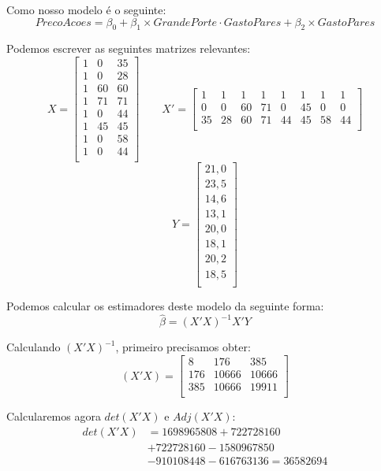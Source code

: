 \documentclass[]{ufpe-exercises}
\begin{document}
\begin{questions}
\begin{parts}
\begin{solution}
			\vspace{0.2cm}

			Como nosso modelo é o seguinte:
			\[ PrecoAcoes = \beta_{0} + \beta_{1} \times GrandePorte \cdot GastoPares + \beta_{2} \times GastoPares\]

			Podemos escrever as seguintes matrizes relevantes:
			\[ X =
				\begin{bmatrix}
					1 & 0  & 35 \\
					1 & 0  & 28 \\
					1 & 60 & 60 \\
					1 & 71 & 71 \\
					1 & 0  & 44 \\
					1 & 45 & 45 \\
					1 & 0  & 58 \\
					1 & 0  & 44 \\
				\end{bmatrix} \qquad
				X' =
				\begin{bmatrix}
					1  & 1  & 1  & 1  & 1  & 1  & 1  & 1  \\
					0  & 0  & 60 & 71 & 0  & 45 & 0  & 0  \\
					35 & 28 & 60 & 71 & 44 & 45 & 58 & 44 \\
				\end{bmatrix}
			\]
			\[
				Y =
				\begin{bmatrix}
					21,0 \\
					23,5 \\
					14,6 \\
					13,1 \\
					20,0 \\
					18,1 \\
					20,2 \\
					18,5 \\
				\end{bmatrix}
			\]

			Podemos calcular os estimadores deste modelo da seguinte forma:
			\[\hat{\beta} = (X'X)^{-1}X'Y\]

			Calculando \((X'X)^{-1}\), primeiro precisamos obter:
			\[
				(X'X) =
				\begin{bmatrix}
					8   & 176   & 385   \\
					176 & 10666 & 10666 \\
					385 & 10666 & 19911 \\
				\end{bmatrix}
			\]

			Calcularemos agora \(det(X'X)\) e \(Adj(X'X)\):
			\begin{align*}
				det(X'X) & = 1698965808 + 722728160           \\
				         & + 722728160 - 1580967850           \\
				         & - 910108448 - 616763136 = 36582694
			\end{align*}


\end{solution}
\end{parts}
\end{questions}
\end{document}
